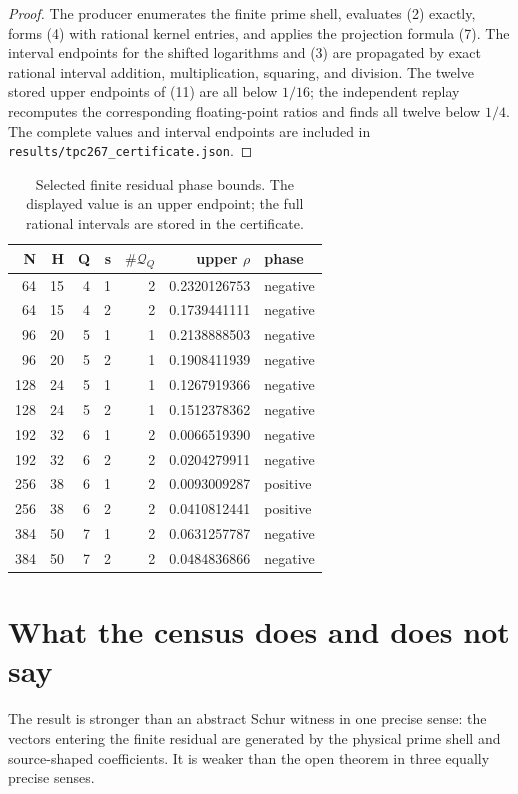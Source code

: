 \documentclass[11pt]{article}
\newcommand{\cQ}{\mathcal Q}
\begin{document}
\begin{proof}
The producer enumerates the finite prime shell, evaluates (2) exactly, forms
(4) with rational kernel entries, and applies the projection formula (7).
The interval endpoints for the shifted logarithms and (3) are propagated by
exact rational interval addition, multiplication, squaring, and division.
The twelve stored upper endpoints of (11) are all below \(1/16\); the
independent replay recomputes the corresponding floating-point ratios and
finds all twelve below \(1/4\).  The complete values and interval endpoints
are included in
\texttt{results/tpc267\_certificate.json}.
\end{proof}

\begin{table}[t]
\centering
\caption{Selected finite residual phase bounds.  The displayed value is an
upper endpoint; the full rational intervals are stored in the certificate.}
\small
\begin{tabular}{rrrrr r l}
\toprule
N & H & Q & s & \(\#\cQ_Q\) & upper \(\rho\) & phase\\
\midrule
64  &15&4&1&2&0.2320126753&negative\\
64  &15&4&2&2&0.1739441111&negative\\
96  &20&5&1&1&0.2138888503&negative\\
96  &20&5&2&1&0.1908411939&negative\\
128 &24&5&1&1&0.1267919366&negative\\
128 &24&5&2&1&0.1512378362&negative\\
192 &32&6&1&2&0.0066519390&negative\\
192 &32&6&2&2&0.0204279911&negative\\
256 &38&6&1&2&0.0093009287&positive\\
256 &38&6&2&2&0.0410812441&positive\\
384 &50&7&1&2&0.0631257787&negative\\
384 &50&7&2&2&0.0484836866&negative\\
\bottomrule
\end{tabular}
\end{table}

\section{What the census does and does not say}

The result is stronger than an abstract Schur witness in one precise sense:
the vectors entering the finite residual are generated by the physical prime
shell and source-shaped coefficients.  It is weaker than the open theorem in
three equally precise senses.
\end{document}
